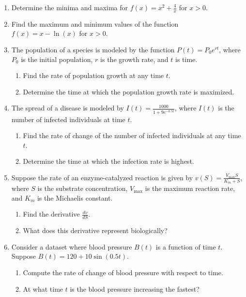 \documentclass[12pt]{article}
\begin{document}
\begin{enumerate}[itemsep=20pt]
    \item Determine the minima and maxima for \( f(x) = x^2 + \frac{4}{x} \) for \( x > 0 \).
    
    \item Find the maximum and minimum values of the function \( f(x) = x - \ln(x) \) for \( x > 0 \).

    \item The population of a species is modeled by the function \( P(t) = P_0 e^{rt} \), where \( P_0 \) is the initial population, \( r \) is the growth rate, and \( t \) is time.
    \begin{enumerate}[label=(\alph*), itemsep=10pt]
        \item Find the rate of population growth at any time \( t \).
        \item Determine the time at which the population growth rate is maximized.
    \end{enumerate}

    \item The spread of a disease is modeled by \( I(t) = \frac{1000}{1 + 9e^{-0.5t}} \), where \( I(t) \) is the number of infected individuals at time \( t \).
    \begin{enumerate}[label=(\alph*), itemsep=10pt]
        \item Find the rate of change of the number of infected individuals at any time \( t \).
        \item Determine the time at which the infection rate is highest.
    \end{enumerate}
    
    \item Suppose the rate of an enzyme-catalyzed reaction is given by \( v(S) = \frac{V_{\max}S}{K_m + S} \), where \( S \) is the substrate concentration, \( V_{\max} \) is the maximum reaction rate, and \( K_m \) is the Michaelis constant.
    \begin{enumerate}[label=(\alph*), itemsep=10pt]
        \item Find the derivative \( \frac{dv}{dS} \).
        \item What does this derivative represent biologically?
    \end{enumerate}

    \item Consider a dataset where blood pressure \( B(t) \) is a function of time \( t \). Suppose \( B(t) = 120 + 10\sin(0.5t) \).
    \begin{enumerate}[label=(\alph*), itemsep=10pt]
        \item Compute the rate of change of blood pressure with respect to time.
        \item At what time \( t \) is the blood pressure increasing the fastest?
    \end{enumerate}


\end{enumerate}
\end{document}
